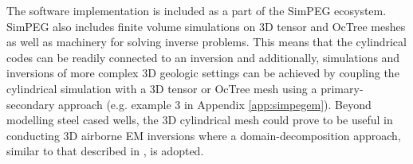 The software implementation is included as a part of the SimPEG ecosystem. SimPEG also includes finite volume simulations on 3D tensor and OcTree meshes as well as machinery for solving inverse problems. This means that the cylindrical codes can be readily connected to an inversion and additionally, simulations and inversions of more complex 3D geologic settings can be achieved by coupling the cylindrical simulation with a 3D tensor or OcTree mesh using a primary-secondary approach (e.g. example 3 in Appendix \ref{app:simpegem}). Beyond modelling steel cased wells, the 3D cylindrical mesh could prove to be useful in conducting 3D airborne EM inversions where a domain-decomposition approach, similar to that described in \cite{Yang2014}, is adopted.

